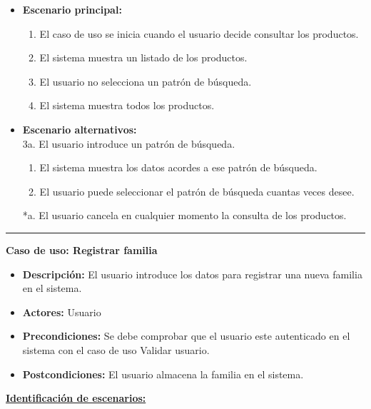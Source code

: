 \begin{itemize}\renewcommand{\labelitemi}{$\circ$}
 \item \textbf{Escenario principal:}
         \begin{enumerate}
          \item El caso de uso se inicia cuando el usuario decide consultar los productos.
          \item El sistema muestra un listado de los productos.
          \item El usuario no selecciona un patrón de búsqueda.
          \item El sistema muestra todos los productos.
         \end{enumerate}
  \item \textbf{Escenario alternativos:}\\
  			3a. El usuario introduce un patrón de búsqueda.
  			\begin{enumerate}
  			\item El sistema muestra los datos acordes a ese patrón de búsqueda.
  			\item El usuario puede seleccionar el patrón de búsqueda cuantas veces desee.
  			\end{enumerate}
          *a. El usuario cancela en cualquier momento la consulta de los productos.
\end{itemize}
\smallskip
\hrule height 1pt
\smallskip
\textbf{Caso de uso: Registrar familia}
\begin{itemize}\renewcommand{\labelitemi}{$\cdot$}
 \item \textbf{Descripción:} El usuario introduce los datos para registrar una nueva familia en el sistema.
  \item \textbf{Actores:} Usuario
  \item \textbf{Precondiciones:} Se debe comprobar que el usuario este autenticado en el sistema con el caso de uso Validar usuario.
  \item \textbf{Postcondiciones:} El usuario almacena la familia en el sistema.
\end{itemize}
\underline{\textbf{Identificación de escenarios:}}
